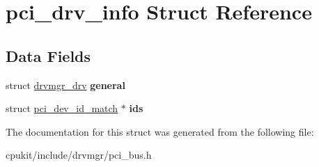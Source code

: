 \hypertarget{structpci__drv__info}{}\section{pci\+\_\+drv\+\_\+info Struct Reference}
\label{structpci__drv__info}
\subsection*{Data Fields}
\begin{DoxyCompactItemize}
\item 
\mbox{\label{structpci__drv__info_a0990f8d9c3b244cfda6e92d34e4106e2}} 
struct \mbox{\hyperlink{structdrvmgr__drv}{drvmgr\+\_\+drv}} {\bfseries general}
\item 
\mbox{\label{structpci__drv__info_a1ed94c64670296c8ad38a29ef8a5d5f5}} 
struct \mbox{\hyperlink{structpci__dev__id__match}{pci\+\_\+dev\+\_\+id\+\_\+match}} $\ast$ {\bfseries ids}
\end{DoxyCompactItemize}


The documentation for this struct was generated from the following file\+:\begin{DoxyCompactItemize}
\item 
cpukit/include/drvmgr/pci\+\_\+bus.\+h\end{DoxyCompactItemize}

